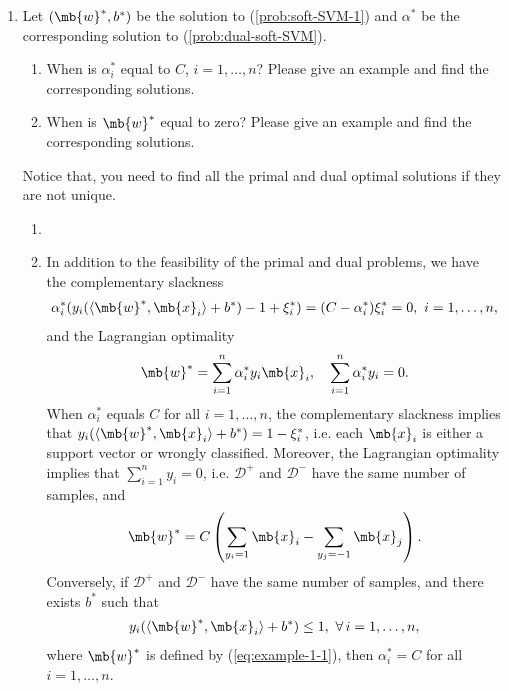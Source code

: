 \begin{exercise}
\begin{enumerate}
        \item Let $(\mb{w}^*,b^*)$ be the solution to (\ref{prob:soft-SVM-1}) and $\alpha^*$ be the corresponding solution to (\ref{prob:dual-soft-SVM}).
            \begin{enumerate}
                \item When is $\alpha_i^*$ equal to $C$, $i=1,\ldots,n$? Please give an example and find the corresponding solutions.
                \item When is $\mb{w}^*$ equal to zero? Please give an example and find the corresponding solutions.
            \end{enumerate}
            Notice that, you need to find all the primal and dual optimal solutions if they are not unique.


            \begin{solution}
                \begin{enumerate}
                    \item []
                    \item
                        In addition to the feasibility of the primal and dual problems, we have the complementary slackness
                        \begin{align*}
                            \alpha_i^*(y_i(\langle\mb{w}^*,\mb{x}_i\rangle+b^*) - 1 + \xi_i^*) = (C-\alpha_i^*) \xi_i^*=0,\ i=1,\ldots,n,
                        \end{align*}
                        and the Lagrangian optimality
                        \begin{align*}
                            \mb{w}^* = \sum_{i=1}^n\alpha_i^*y_i\mb{x}_i,\quad \sum_{i=1}^n\alpha_i^*y_i=0.
                        \end{align*}
                        When $\alpha_i^*$ equals $C$ for all $i=1,\ldots,n$, the complementary slackness implies that $y_i(\langle\mb{w}^*,\mb{x}_i\rangle+b^*)=1 - \xi_i^*$, i.e. each $\mb{x}_i$ is either a support vector or wrongly classified. Moreover, the Lagrangian optimality implies that $\sum_{i=1}^n y_i = 0$, i.e. $\mathcal{D}^+$ and $\mathcal{D}^-$ have the same number of samples, and
                        \begin{align}\label{eq:example-1-1}
                            \mb{w}^* = C\left(\sum_{y_i = 1} \mb{x}_i - \sum_{y_j = -1} \mb{x}_j\right).
                        \end{align}
                        Conversely, if $\mathcal{D}^+$ and $\mathcal{D}^-$ have the same number of samples, and there exists $b^*$ such that
                        \begin{align}\label{eq:example-1-2}
                            y_i(\langle\mb{w}^*,\mb{x}_i\rangle+b^*)\le 1,\ \forall\, i=1,\ldots,n,
                        \end{align}
                        where $\mb{w}^*$ is defined by (\ref{eq:example-1-1}), then $\alpha_i^* = C$ for all $i=1,\ldots,n$.


\end{enumerate}
\end{solution}
\end{enumerate}
\end{exercise}
